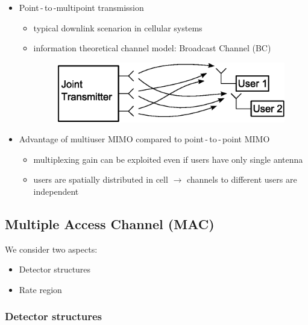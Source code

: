 \documentclass[a4paper, 10pt]{article}
\begin{document}
\begin{itemize}
\begin{itemize}
	\end{itemize}
	\item Point\,-\,to\,-multipoint transmission
	\begin{itemize}
		\item typical downlink scenarion in cellular systems
		\item information theoretical channel model: Broadcast Channel (BC)
		\begin{figure}[h]\centering
			\includegraphics[scale=0.8]{BC}
		\end{figure}	
	\end{itemize}
	\item Advantage of multiuser MIMO compared to point\,-\,to\,-\,point MIMO
	\begin{itemize}
		\item multiplexing gain can be exploited even if users have only single antenna
		\item users are spatially distributed in cell $\rightarrow $ channels to different users are independent
	\end{itemize}
\end{itemize}
\subsection{Multiple Access Channel (MAC)}
We consider two aspects:
\begin{itemize}
	\item Detector structures
	\item Rate region
\end{itemize}
\subsubsection{Detector structures}
\end{document}
